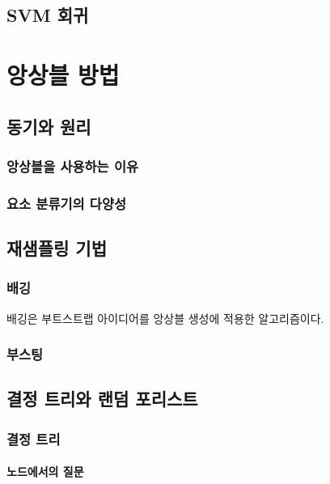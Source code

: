 \documentclass [12pt] {oblivoir}
\let\oldsubsubsection=\subsubsection
\renewcommand{\subsubsection}
{
  \filbreak
  \oldsubsubsection
}
\begin{document}
\subsection{SVM 회귀}

\newpage
\section{앙상블 방법}

\subsection{동기와 원리}

\subsubsection{앙상블을 사용하는 이유}

\subsubsection{요소 분류기의 다양성}

\subsection{재샘플링 기법}

\subsubsection{배깅}

배깅은 부트스트랩 아이디어를 앙상블 생성에 적용한 알고리즘이다.

\subsubsection{부스팅}

\subsection{결정 트리와 랜덤 포리스트}

\subsubsection{결정 트리}

\paragraph*{노드에서의 질문}\mbox{}
\end{document}
